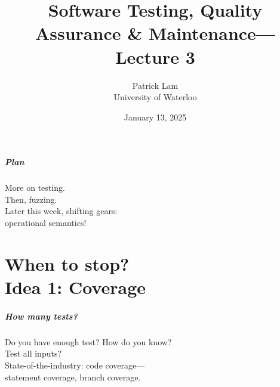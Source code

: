 \documentclass{beamer}
\title{Software Testing, Quality Assurance \& Maintenance---Lecture 3}
\author{Patrick Lam\\University of Waterloo}
\date{January 13, 2025}
\newenvironment{changemargin}[1]{%
  \begin{list}{}{%
    \setlength{\topsep}{0pt}%
    \setlength{\leftmargin}{#1}%
    \setlength{\rightmargin}{1em}
    \setlength{\listparindent}{\parindent}%
    \setlength{\itemindent}{\parindent}%
    \setlength{\parsep}{\parskip}%
  }%
  \item[]}{\end{list}}
\begin{document}
\begin{frame}
  \titlepage
\end{frame}

\begin{frame}
  \frametitle{Plan}

  \begin{changemargin}{2em}

    More on testing.\\[1em]

    Then, fuzzing.\\[2em]

    Later this week, shifting gears: \\
    \hspace*{2em} operational semantics!
  \end{changemargin}
\end{frame}

\part{When to stop? \\ Idea 1: Coverage}
\begin{frame}
  \partpage
\end{frame}

\begin{frame}
  \frametitle{How many tests?}
  \Large
  \begin{changemargin}{2em}
    Do you have enough test? How do you know?\\[1em]

    Test all inputs?\\[1em]

    State-of-the-industry: code coverage---\\[1em]
    \hspace*{2em} statement coverage, branch coverage.
  \end{changemargin}
\end{frame}
\end{document}
